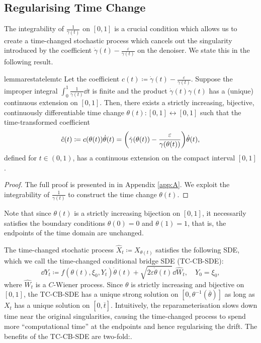 \subsection{Regularising Time Change}\label{sec:tc}
The integrability of \(\frac{1}{\gamma(t)}\) on \([0, 1]\) is a crucial condition which allows us to create a time-changed stochastic process which cancels out the singularity introduced by the coefficient \(\dot{\gamma}(t) - \frac{\varepsilon}{\gamma(t)}\) on the denoiser. We state this in the following result.
\begin{theorembox}
  \begin{restatable}{lemma}{restatelemtc}\label{lem:tc}
    Let the coefficient \(c(t) \coloneqq \dot{\gamma}(t) - \frac{\varepsilon}{\gamma(t)}\). Suppose the improper integral \(\int_{0}^{1} \frac{1}{\gamma(t)} \dd{t}\) is finite and the product \(\dot{\gamma}(t) \gamma(t) \) has a (unique) continuous extension on \([0, 1]\). Then, there exists a strictly increasing, bijective, continuously differentiable time change \(\theta(t) : [0,1] \leftrightarrow [0, 1]\) such that the time-transformed coefficient
    \begin{equation}
      \hat{c}(t) \coloneqq c(\theta(t))\dot{\theta}(t) = \qty(\dot{\gamma}(\theta(t)) - \frac{\varepsilon}{\gamma(\theta(t))})\dot{\theta}(t), \label{eqn:chat}
    \end{equation}
    defined for \(t \in (0, 1)\), has a continuous extension on the compact interval \([0, 1]\).
  \end{restatable}
\end{theorembox}
\begin{proof}
  The full proof is presented in  in Appendix \ref{app:A}. We exploit the integrability of \(\frac{1}{\gamma(t)}\) to construct the time change \(\theta(t)\).
\end{proof}
\begin{remarkbox}
  \begin{remark}
    Note that since \(\theta(t)\) is a strictly increasing bijection on \([0, 1]\), it necessarily satisfies the boundary conditions \(\theta(0) = 0\) and \(\theta(1) = 1\), that is, the endpoints of the time domain are unchanged.
  \end{remark}
\end{remarkbox}
The time-changed stochatic process \(\hat{X}_{t} \coloneqq X_{\theta(t)}\) satisfies the following SDE, which we call the time-changed conditional bridge SDE (TC-CB-SDE):
\begin{equation}
  \dd{Y_{t}} \coloneqq f(\theta(t), \xi_{0}, Y_{t}) \dot{\theta}(t) + \sqrt{2\varepsilon \dot{\theta}(t)} \dd{ \hat{W}_{t}}, \quad Y_{0} = \xi_{0}, \label{eqn:tccbsde}
\end{equation}
where \(\hat{W}_{t}\)  is a \(C\)-Wiener process. Since \(\theta\) is strictly increasing and bijective on \([0, 1]\), the TC-CB-SDE has a unique strong solution on \([0, \theta^{-1}(\overline{\theta})]\) as long as \(X_{t}\) has a unique solution on \([0, \overline{t}]\). Intuitively, the reparameterisation slows down time near the original singularities, causing the time-changed process to spend more ``computational time'' at the endpoints and hence regularising the drift. The benefits of the TC-CB-SDE are two-fold:.

